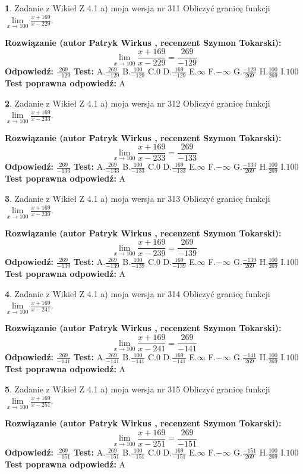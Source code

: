 \documentclass[12pt, a4paper]{article}
\theoremstyle{definition} %
\newtheorem{zad}{}
\newcommand{\zadStart}[1]{\begin{zad}#1\newline}
\newcommand{\zadStop}{\end{zad}}
\newcommand{\rozwStart}[2]{\noindent \textbf{Rozwiązanie (autor #1 , recenzent #2): }\newline}
\newcommand{\rozwStop}{\newline}
\newcommand{\odpStart}{\noindent \textbf{Odpowiedź:}\newline}
\newcommand{\odpStop}{\newline}
\newcommand{\testStart}{\noindent \textbf{Test:}\newline}
\newcommand{\testStop}{\newline}
\newcommand{\kluczStart}{\noindent \textbf{Test poprawna odpowiedź:}\newline}
\newcommand{\kluczStop}{\newline}
\begin{document}
\zadStart{Zadanie z Wikieł Z 4.1 a) moja wersja nr 311}
Obliczyć granicę funkcji $\lim\limits_{x\to100}\frac{x+169}{x-229}$.
\zadStop
\rozwStart{Patryk Wirkus}{Szymon Tokarski}
$$\lim\limits_{x\to100}\frac{x+169}{x-229} = \frac{269}{-129}$$
\rozwStop
\odpStart
$\frac{269}{-129}$
\odpStop
\testStart
A.$\frac{269}{-129}$
B.$\frac{100}{-129}$
C.$0$
D.$\frac{169}{-129}$
E.$\infty$
F.$-\infty$
G.$\frac{-129}{269}$
H.$\frac{100}{269}$
I.$100$
\testStop
\kluczStart
A
\kluczStop



\zadStart{Zadanie z Wikieł Z 4.1 a) moja wersja nr 312}
Obliczyć granicę funkcji $\lim\limits_{x\to100}\frac{x+169}{x-233}$.
\zadStop
\rozwStart{Patryk Wirkus}{Szymon Tokarski}
$$\lim\limits_{x\to100}\frac{x+169}{x-233} = \frac{269}{-133}$$
\rozwStop
\odpStart
$\frac{269}{-133}$
\odpStop
\testStart
A.$\frac{269}{-133}$
B.$\frac{100}{-133}$
C.$0$
D.$\frac{169}{-133}$
E.$\infty$
F.$-\infty$
G.$\frac{-133}{269}$
H.$\frac{100}{269}$
I.$100$
\testStop
\kluczStart
A
\kluczStop



\zadStart{Zadanie z Wikieł Z 4.1 a) moja wersja nr 313}
Obliczyć granicę funkcji $\lim\limits_{x\to100}\frac{x+169}{x-239}$.
\zadStop
\rozwStart{Patryk Wirkus}{Szymon Tokarski}
$$\lim\limits_{x\to100}\frac{x+169}{x-239} = \frac{269}{-139}$$
\rozwStop
\odpStart
$\frac{269}{-139}$
\odpStop
\testStart
A.$\frac{269}{-139}$
B.$\frac{100}{-139}$
C.$0$
D.$\frac{169}{-139}$
E.$\infty$
F.$-\infty$
G.$\frac{-139}{269}$
H.$\frac{100}{269}$
I.$100$
\testStop
\kluczStart
A
\kluczStop



\zadStart{Zadanie z Wikieł Z 4.1 a) moja wersja nr 314}
Obliczyć granicę funkcji $\lim\limits_{x\to100}\frac{x+169}{x-241}$.
\zadStop
\rozwStart{Patryk Wirkus}{Szymon Tokarski}
$$\lim\limits_{x\to100}\frac{x+169}{x-241} = \frac{269}{-141}$$
\rozwStop
\odpStart
$\frac{269}{-141}$
\odpStop
\testStart
A.$\frac{269}{-141}$
B.$\frac{100}{-141}$
C.$0$
D.$\frac{169}{-141}$
E.$\infty$
F.$-\infty$
G.$\frac{-141}{269}$
H.$\frac{100}{269}$
I.$100$
\testStop
\kluczStart
A
\kluczStop



\zadStart{Zadanie z Wikieł Z 4.1 a) moja wersja nr 315}
Obliczyć granicę funkcji $\lim\limits_{x\to100}\frac{x+169}{x-251}$.
\zadStop
\rozwStart{Patryk Wirkus}{Szymon Tokarski}
$$\lim\limits_{x\to100}\frac{x+169}{x-251} = \frac{269}{-151}$$
\rozwStop
\odpStart
$\frac{269}{-151}$
\odpStop
\testStart
A.$\frac{269}{-151}$
B.$\frac{100}{-151}$
C.$0$
D.$\frac{169}{-151}$
E.$\infty$
F.$-\infty$
G.$\frac{-151}{269}$
H.$\frac{100}{269}$
I.$100$
\testStop
\kluczStart
A
\kluczStop
\end{document}
